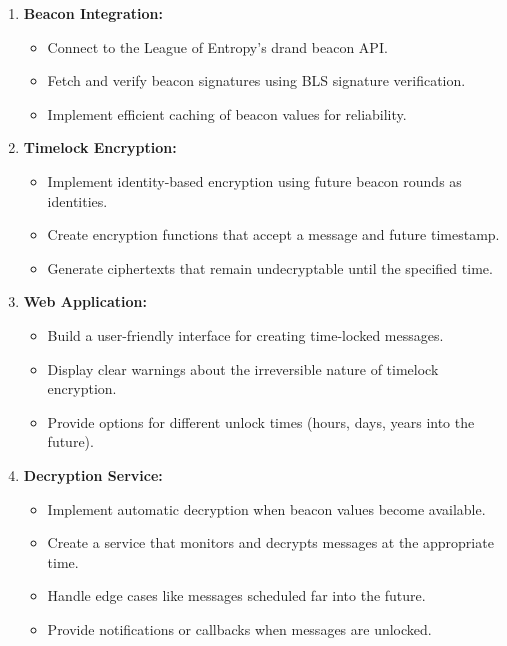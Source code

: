 \documentclass[10pt,a4paper,american]{exam}
\begin{document}
\begin{enumerate}
	\item \textbf{Beacon Integration:}
	      \begin{itemize}
		      \item Connect to the League of Entropy's drand beacon API.
		      \item Fetch and verify beacon signatures using BLS signature verification.
		      \item Implement efficient caching of beacon values for reliability.
	      \end{itemize}

	\item \textbf{Timelock Encryption:}
	      \begin{itemize}
		      \item Implement identity-based encryption using future beacon rounds as identities.
		      \item Create encryption functions that accept a message and future timestamp.
		      \item Generate ciphertexts that remain undecryptable until the specified time.
	      \end{itemize}

	\item \textbf{Web Application:}
	      \begin{itemize}
		      \item Build a user-friendly interface for creating time-locked messages.
		      \item Display clear warnings about the irreversible nature of timelock encryption.
		      \item Provide options for different unlock times (hours, days, years into the future).
	      \end{itemize}

	\item \textbf{Decryption Service:}
	      \begin{itemize}
		      \item Implement automatic decryption when beacon values become available.
		      \item Create a service that monitors and decrypts messages at the appropriate time.
		      \item Handle edge cases like messages scheduled far into the future.
		      \item Provide notifications or callbacks when messages are unlocked.
	      \end{itemize}
\end{enumerate}
\end{document}
